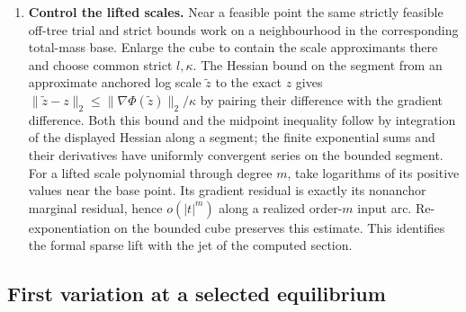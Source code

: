 \documentclass[11pt,a4paper]{article}
\theoremstyle{definition}
\theoremstyle{remark}\newaliascnt{remark}{theorem}
\numberwithin{equation}{section}
\begin{document}
\begin{enumerate}[titledsteps]
For \(\epsilon_n=\kappa 2^{-2n-4}\), midpoint strong convexity as in \cref{thm:mean-inverse} gives

\[
 \|z_n-z_m\|_2^2\le4(\epsilon_n+\epsilon_m)/\kappa.
\]
 The limit minimizes \(\Phi\), lies in the interior by coercivity, and satisfies \(DP(z)=\widehat b\). Its scales are $r_i=\exp z_i,\ c_j=\exp(-z_j)$. In the notation of \cref{thm:global-balance-inverse}, the anchored potential is $\phi=-z$. Conversely positive anchored scales have logarithms and give a critical point. To compute $\log x$ for $x>0$, search for $n$ with $e^{-n}<x<e^n$ and start with the bracket $[-n,n]$ for $\log x$. At its trisection points $a<b'$ run the tests \(e^a<x\) and \(x<e^{b'}\) in parallel. Locatedness and \(e^a<e^{b'}\) ensure a hit. On the first success retain the interval from $a$ to the old upper endpoint, and on the second retain the interval from the old lower endpoint to $b'$. Each interval has two thirds of the previous width. Continuity and strict increase of the exponential identify the limit. Convexity makes a critical point minimizing. Coercivity places it in the cube and strong convexity gives uniqueness. A positive scaling supplies its own feasible flow, so graph projection is invertible on exactly the positive-feasibility image over located affinities.


    \item \textbf{Control the lifted scales.} Near a feasible point the same strictly feasible off-tree trial and strict bounds work on a neighbourhood in the corresponding total-mass base. Enlarge the cube to contain the scale approximants there and choose common strict $l,\kappa$. The Hessian bound on the segment from an approximate anchored log scale $\tilde z$ to the exact $z$ gives $\|\tilde z-z\|_2\le\|\nabla\Phi(\tilde z)\|_2/\kappa$ by pairing their difference with the gradient difference. Both this bound and the midpoint inequality follow by integration of the displayed Hessian along a segment; the finite exponential sums and their derivatives have uniformly convergent series on the bounded segment. For a lifted scale polynomial through degree $m$, take logarithms of its positive values near the base point. Its gradient residual is exactly its nonanchor marginal residual, hence $o(|t|^m)$ along a realized order-$m$ input arc. Re-exponentiation on the bounded cube preserves this estimate. This identifies the formal sparse lift with the jet of the computed section.
\end{enumerate}

\subsection{First variation at a selected equilibrium}
\end{document}
